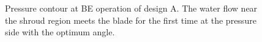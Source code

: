 \begin{figure}[h!]
\begin{minipage}[b]{1\linewidth}
 \centering
\end{minipage}
\caption{Pressure contour at BE operation of design A. The water flow near the shroud region meets the blade for the first time at the pressure side with the optimum angle. }
\label{design-BE-M}
\end{figure}
